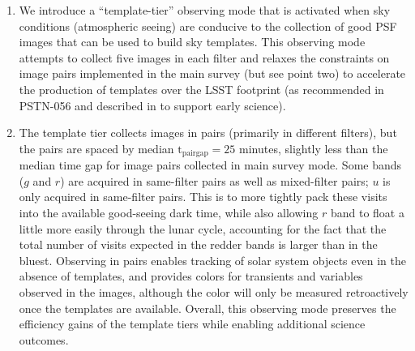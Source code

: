 \documentclass[SE,authoryear,toc]{lsstdoc}
\begin{document}
\begin{enumerate}
\item We introduce a ``template-tier'' observing mode that is activated when sky conditions (atmospheric seeing) are conducive to the collection of good PSF images that can be used to build sky templates. This observing mode attempts to collect five images in each filter and relaxes the constraints on image pairs implemented in the main survey (but see point two) to accelerate the production of templates over the LSST footprint (as recommended in PSTN-056 and described in \citealt{rtn-011} to support early science).

\item The template tier collects images in pairs (primarily in different filters), but the pairs are spaced by median $\mathrm{t_{pair gap}}=25$ minutes, slightly less than the median time gap for image pairs collected in main survey mode. Some bands ($g$ and $r$) are acquired in same-filter pairs as well as mixed-filter pairs; $u$ is only acquired in same-filter pairs. This is to more tightly pack these visits into the available good-seeing dark time, while also allowing $r$ band to float a little more easily through the lunar cycle, accounting for the fact that the total number of visits expected in the redder bands is larger than in the bluest. Observing in pairs enables tracking of solar system objects even in the absence of templates, and provides colors for transients and variables observed in the images, although the color will only be measured retroactively once the templates are available. Overall, this observing mode preserves the efficiency gains of the template tiers while enabling additional science outcomes. 


\end{enumerate}
\end{document}
